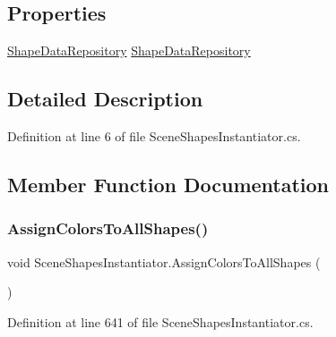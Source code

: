 \subsection*{Properties}
\begin{DoxyCompactItemize}
\item 
\mbox{\hyperlink{class_shape_data_repository}{Shape\+Data\+Repository}} \mbox{\hyperlink{class_scene_shapes_instantiator_a59448891f574b4153d072c9815f626e4}{Shape\+Data\+Repository}}
\end{DoxyCompactItemize}


\subsection{Detailed Description}


Definition at line 6 of file Scene\+Shapes\+Instantiator.\+cs.



\subsection{Member Function Documentation}
\mbox{\label{class_scene_shapes_instantiator_a3575e9b10cd0aa419f47977ef6dda3d2}} 
\subsubsection{\texorpdfstring{AssignColorsToAllShapes()}{AssignColorsToAllShapes()}}
{\footnotesize\ttfamily void Scene\+Shapes\+Instantiator.\+Assign\+Colors\+To\+All\+Shapes (\begin{DoxyParamCaption}{ }\end{DoxyParamCaption})}



Definition at line 641 of file Scene\+Shapes\+Instantiator.\+cs.

\mbox{\label{class_scene_shapes_instantiator_a29c0c752b7e68cd04618f1e4de089df9}} 
